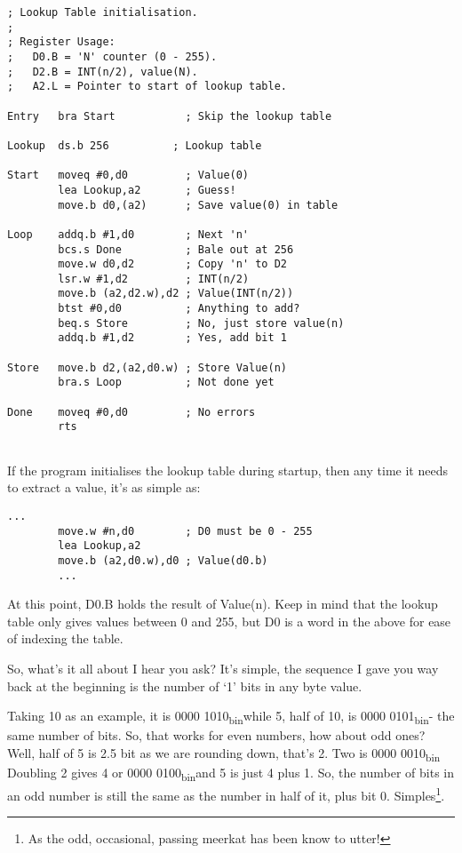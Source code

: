 \begin{lstlisting}[caption={Initialising the lookup table}]
; Lookup Table initialisation.
;
; Register Usage:
;	D0.B = 'N' counter (0 - 255).
;	D2.B = INT(n/2), value(N).
;	A2.L = Pointer to start of lookup table.

Entry   bra Start           ; Skip the lookup table

Lookup  ds.b 256  		  ; Lookup table
  	  
Start   moveq #0,d0         ; Value(0)
        lea Lookup,a2       ; Guess!
        move.b d0,(a2)      ; Save value(0) in table

Loop    addq.b #1,d0        ; Next 'n'
        bcs.s Done          ; Bale out at 256
        move.w d0,d2        ; Copy 'n' to D2
        lsr.w #1,d2         ; INT(n/2)
        move.b (a2,d2.w),d2 ; Value(INT(n/2))
        btst #0,d0          ; Anything to add?
        beq.s Store         ; No, just store value(n)
        addq.b #1,d2        ; Yes, add bit 1

Store   move.b d2,(a2,d0.w) ; Store Value(n) 
        bra.s Loop          ; Not done yet

Done    moveq #0,d0         ; No errors
        rts
		
\end{lstlisting}

If the program initialises the lookup table during startup, then any
time it needs to extract a value, it's as simple as:

\begin{lstlisting}[caption={Using the lookup table to find a value}]
        ...
        move.w #n,d0		; D0 must be 0 - 255
        lea Lookup,a2
        move.b (a2,d0.w),d0 ; Value(d0.b)
        ...
\end{lstlisting}

At this point, D0.B holds the result of Value(n). Keep in mind that
the lookup table only gives values between 0 and 255, but D0 is a
word in the above for ease of indexing the table.

So, what's it all about I hear you ask? It's simple, the sequence
I gave you way back at the beginning is the number of `1' bits in
any byte value. 

Taking 10 as an example, it is 0000 1010\textsubscript{bin}while
5, half of 10, is 0000 0101\textsubscript{bin}- the same number of
bits. So, that works for even numbers, how about odd ones? Well, half
of 5 is 2.5 bit as we are rounding down, that's 2. Two is 0000 0010\textsubscript{bin}
Doubling 2 gives 4 or 0000 0100\textsubscript{bin}and 5 is just 4
plus 1. So, the number of bits in an odd number is still the same
as the number in half of it, plus bit 0. Simples\footnote{As the odd, occasional, passing meerkat has been know to utter!}.

